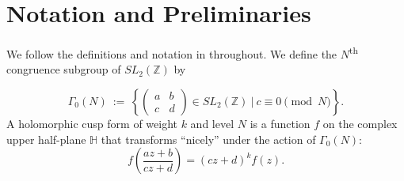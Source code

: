 \documentclass[12pt, reqno,oneside]{amsart}
\theoremstyle{plain}
\theoremstyle{definition}
\theoremstyle{remark}
\theoremstyle{plain}
\numberwithin{equation}{section}
\begin{document}
\section{Notation and Preliminaries}\label{sec:2}

We follow the definitions and notation in \cite{IK04} throughout. We define the $N$\textsuperscript{th} congruence subgroup of $SL_2(\mathbb{Z})$ by

\begin{equation}\label{eq:cong-subgroup}
\Gamma_0(N) \ := \ \left\{ \begin{pmatrix} 
a & b \\ c & d 
\end{pmatrix} \in SL_2(\mathbb{Z}) \ \Bigg| \ c \equiv 0 \pmod{N} \right\}.
\end{equation} 
A holomorphic cusp form of weight $k$ and level $N$ is a function $f$ on the complex upper half-plane $\mathbb{H}$ that transforms ``nicely'' under the action of $\Gamma_0(N)$:
\begin{equation}
f\left( \frac{az + b}{cz + d} \right) = (cz + d)^{k} f(z).
\end{equation}
\end{document}
